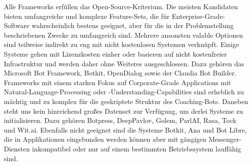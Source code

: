         Alle Frameworks erfüllen das Open-Source-Kriterium. Die meisten Kandidaten bieten umfangreiche und komplexe Feature-Sets, die für Enterprise-Grade-Software wahrscheinlich bestens geeignet, aber für die in der Problemstellung beschriebenen Zwecke zu umfangreich sind. Mehrere ansonsten valable Optionen sind teilweise indirekt zu eng mit nicht kostenlosen Systemen verknüpft. Einige Systeme gehen mit Lizenzkosten einher oder basieren auf nicht kostenfreier Infrastruktur und werden daher ohne Weiteres ausgeschlossen. Dazu gehören das Microsoft Bot Framework, Botkit, OpenDialog sowie der Claudia Bot Builder. Frameworks mit einem starken Fokus auf Corporate-Grade Applications mit Natural-Language-Processing oder -Understanding-Capabilities sind erheblich zu mächtig und zu komplex für die geskriptete Struktur des Coaching-Bots. Daneben steht uns kein hinreichend großes Datenset zur Verfügung, um derlei Systeme zu initialisieren. Dazu gehören Botpress, DeepPavlov, Golem, ParlAI, Rasa, Tock und Wit.ai. Ebenfalls nicht geeignet sind die Systeme Botkit, Ana und Bot Libre, die in Applikationen eingebunden werden können aber mit gängigen Messenger-Diensten inkompatibel oder nur auf einem bestimmten Betriebssystem lauffähig sind.
    
